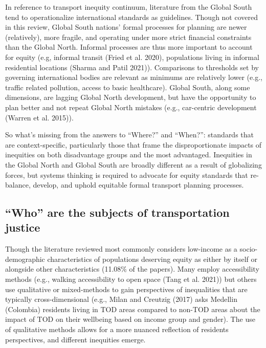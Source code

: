 \documentclass[12pt, oneside]{report}
\begin{document}
In reference to transport inequity continuum, literature from the Global
South tend to operationalize international standards as guidelines.
Though not covered in this review, Global South nations' formal
processes for planning are newer (relatively), more fragile, and
operating under more strict financial constraints than the Global North.
Informal processes are thus more important to account for equity (e.g,
informal transit (Fried et al. 2020), populations living in informal
residential locations (Sharma and Patil 2021)). Comparisons to
thresholds set by governing international bodies are relevant as
minimums are relatively lower (e.g., traffic related pollution, access
to basic healthcare). Global South, along some dimensions, are lagging
Global North development, but have the opportunity to plan better and
not repeat Global North mistakes (e.g., car-centric development (Warren
et al. 2015)).

So what's missing from the answers to ``Where?'' and ``When?'':
standards that are context-specific, particularly those that frame the
disproportionate impacts of inequities on both disadvantage groups and
the most advantaged. Inequities in the Global North and Global South are
broadly different as a result of globalizing forces, but systems
thinking is required to advocate for equity standards that re-balance,
develop, and uphold equitable formal transport planning processes.

\hypertarget{who-are-the-subjects-of-transportation-justice}{%
\subsection{``Who'' are the subjects of transportation
justice}\label{who-are-the-subjects-of-transportation-justice}}

Though the literature reviewed most commonly considers low-income as a
socio-demographic characteristics of populations deserving equity as
either by itself or alongside other characteristics (11.08\% of the
papers). Many employ accessibility methods (e.g., walking accessibility
to open space (Tang et al. 2021)) but others use qualitative or
mixed-methods to gain perspectives of inequalities that are typically
cross-dimensional (e.g., Milan and Creutzig (2017) asks Medellin
(Colombia) residents living in TOD areas compared to non-TOD areas about
the impact of TOD on their wellbeing based on income group and gender).
The use of qualitative methods allows for a more nuanced reflection of
residents perspectives, and different inequities emerge.
\end{document}

